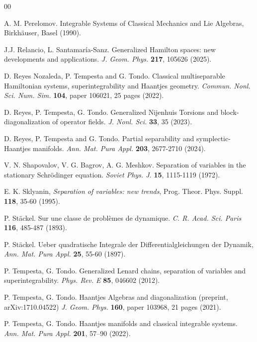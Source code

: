 \documentclass[10pt]{amsart}
\numberwithin{equation}{section}
\newcommand{\tbf}{\textbf}
\theoremstyle{definition}
\begin{document}
\begin{thebibliography}{00}
		
		 A. M. Perelomov. Integrable Systems of Classical Mechanics and Lie Algebras, Birkh{\"a}user, Basel (1990).
		
		 J.J. Relancio, L. Santamaría-Sanz. Generalized Hamilton spaces: new developments and applications. \textit{J. Geom. Phys.} \textbf{217}, 105626 (2025).
		
		 D. Reyes Nozaleda, P. Tempesta and G. Tondo. Classical multiseparable Hamiltonian systems, superintegrability and Haantjes geometry. \textit{Commun. Nonl. Sci. Num. Sim.} \tbf{104}, paper 106021, 25 pages (2022).
		
		 D. Reyes, P. Tempesta, G. Tondo. Generalized Nijenhuis Torsions and block-diagonalization of operator fields. \textit{J. Nonl. Sci. } \textbf{33}, 35 (2023).
		
		 D. Reyes, P. Tempesta and G. Tondo. Partial separability and symplectic-Haantjes manifolds. \textit{Ann. Mat. Pura Appl.} \textbf{203}, 2677-2710 (2024).
		
		
		 V. N. Shapovalov, V. G. Bagrov, A. G. Meshkov. Separation of variables in the stationary Schrödinger equation. \textit{Soviet Phys. J.} \textbf{15}, 1115-1119 (1972).
	
	
	 E. K. Sklyanin, \textit{Separation of variables: new trends}, Prog. Theor. Phys. Suppl. \textbf{118}, 35-60 (1995).


		 P. St\"ackel. Sur une classe de probl\`emes de dynamique. \textit{C. R. Acad. Sci. Paris} \tbf{116}, 485-487 (1893). 
		
		
		
		 P. St\"ackel. Ueber quadratische Integrale
		der Differentialgleichungen der Dynamik, \textit{Ann. Mat. Pura Appl.} \tbf{25}, 55-60 (1897). 
		
		 P. Tempesta, G. Tondo. Generalized Lenard chains, separation of variables and superintegrability. \textit{Phys. Rev. E} \tbf{85}, 046602 (2012).
		
		 P. Tempesta, G. Tondo. Haantjes Algebras and diagonalization (preprint, arXiv:1710.04522) \textit{J. Geom. Phys.} \tbf{160}, paper 103968, 21 pages (2021). 
		
		 P. Tempesta, G. Tondo. Haantjes manifolds and classical integrable systems. \textit{Ann. Mat. Pura Appl.} \tbf{201}, 57–90 (2022).
		
		
		

\end{thebibliography}
\end{document}
